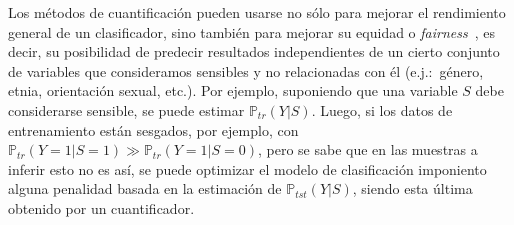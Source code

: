 Los métodos de cuantificación pueden usarse no sólo para mejorar el rendimiento
general de un clasificador, sino también para mejorar su equidad o {\it
fairness\/}~\cite{biswas2021ensuring}, es decir, su posibilidad de predecir
resultados independientes de un cierto conjunto de variables que consideramos
sensibles y no relacionadas con él (e.j.:~género, etnia, orientación sexual,
etc.). Por ejemplo, suponiendo que una variable $S$ debe considerarse sensible,
se puede estimar $\mathbb{P}_{tr}(Y|S)$. Luego, si los datos de entrenamiento
están sesgados, por ejemplo, con $\mathbb{P}_{tr}(Y=1|S=1) \gg
\mathbb{P}_{tr}(Y=1|S=0)$, pero se sabe que en las muestras a inferir esto no es
así, se puede optimizar el modelo de clasificación imponiento alguna penalidad
basada en la estimación de $\mathbb{P}_{tst}(Y|S)$, siendo esta última obtenido
por un cuantificador.
